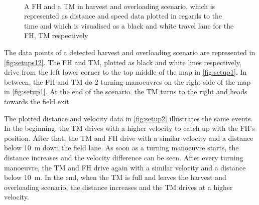 \begin{figure}%
    \centering
   \\
    \caption{A \ac{FH} and a \ac{TM} in harvest and overloading scenario, which is represented as distance and speed data plotted in regards to the
   time and which is visualised as a black and white travel lane for the \ac{FH}, \ac{TM} respectively}%
    \label{fig:setups12}%
\end{figure}

The data points of a detected harvest and overloading scenario are represented in \autoref{fig:setups12}.
The \ac{FH} and \ac{TM}, plotted as black and white lines respectively, drive from the left lower corner to the top middle of the map in \autoref{fig:setup1}.
In between, the \ac{FH} and \ac{TM} do \num{2} turning manoeuvres on the right side of the map in \autoref{fig:setup1}.
At the end of the scenario, the \ac{TM} turns to the right and heads towards the field exit.

The plotted distance and velocity data in \autoref{fig:setup2} illustrates the same events.
In the beginning, the \ac{TM} drives with a higher velocity to catch up with the \ac{FH}'s position.
After that, the \ac{TM} and \ac{FH} drive with a similar velocity and a distance below \SI{10}{\metre} down the field lane.
As soon as a turning manoeuvre starts, the distance increases and the velocity difference can be seen.
After every turning manoeuvre, the \ac{TM} and \ac{FH} drive again with a similar velocity and a distance below \SI{10}{\metre}.
In the end, when the \ac{TM} is full and leaves the harvest and overloading scenario, the distance increases and the \ac{TM} drives at a higher velocity.

